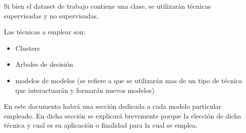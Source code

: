 Si bien el dataset de trabajo contiene una clase, se utilizarán técnicas supervisadas y no supervisadas.

Las técnicas a emplear son:
\begin{itemize}
	\item Clusters
	\item Arboles de decisión
	\item modelos de modelos (se refiere a que se utilizarán mas de un tipo de técnica que interactuarán y formarán nuevos modelos)
\end{itemize}


En este documento habrá una sección dedicada a cada modelo particular empleado. En dicha sección se explicará brevemente porque la elección de dicha técnica y cual es su aplicación o finalidad para la cual se emplea.

